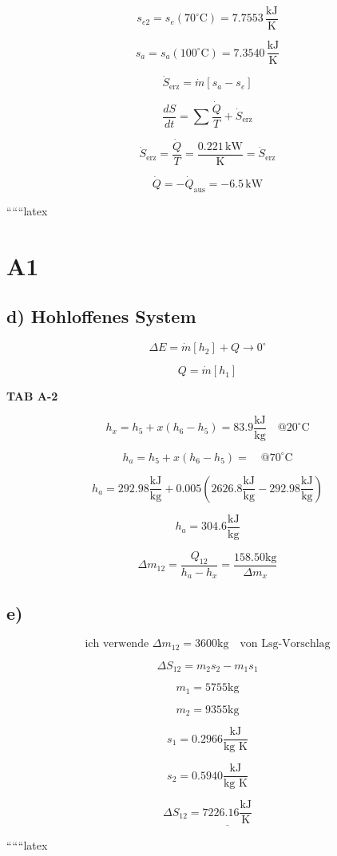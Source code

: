 \[
s_{e2} = s_e (70^\circ \text{C}) = 7.7553 \, \frac{\text{kJ}}{\text{K}}
\]

\[
s_{a} = s_a (100^\circ \text{C}) = 7.3540 \, \frac{\text{kJ}}{\text{K}}
\]

\[
\dot{S}_{\text{erz}} = \dot{m} [s_a - s_e]
\]

\[
\frac{dS}{dt} = \sum \frac{\dot{Q}}{T} + \dot{S}_{\text{erz}}
\]

\[
\dot{S}_{\text{erz}} = \frac{\dot{Q}}{T} = \frac{0.221 \, \text{kW}}{\text{K}} = \dot{S}_{\text{erz}}
\]

\[
\dot{Q} = -\dot{Q}_{\text{aus}} = -6.5 \, \text{kW}
\]

``````latex


\section*{A1}

\subsection*{d) Hohloffenes System}

\[
\Delta E = \dot{m} [h_2] + Q \rightarrow 0^\circ
\]

\[
Q = \dot{m} [h_1]
\]

\textbf{TAB A-2}

\[
h_{x} = h_{5} + x (h_{6} - h_{5}) = 83.9 \frac{\text{kJ}}{\text{kg}} \quad @ 20^\circ \text{C}
\]

\[
h_{a} = h_{5} + x (h_{6} - h_{5}) = \quad @ 70^\circ \text{C}
\]

\[
h_{a} = 292.98 \frac{\text{kJ}}{\text{kg}} + 0.005 \left( 2626.8 \frac{\text{kJ}}{\text{kg}} - 292.98 \frac{\text{kJ}}{\text{kg}} \right)
\]

\[
h_{a} = 304.6 \frac{\text{kJ}}{\text{kg}}
\]

\[
\Delta m_{12} = \frac{Q_{12}}{h_{a} - h_{x}} = \frac{158.50 \text{kg}}{\Delta m_{x}}
\]

\subsection*{e)}

\[
\text{ich verwende } \Delta m_{12} = 3600 \text{kg} \quad \text{von Lsg-Vorschlag}
\]

\[
\Delta S_{12} = m_2 s_2 - m_1 s_1
\]

\[
m_1 = 5755 \text{kg}
\]

\[
m_2 = 9355 \text{kg}
\]

\[
s_1 = 0.2966 \frac{\text{kJ}}{\text{kg K}}
\]

\[
s_2 = 0.5940 \frac{\text{kJ}}{\text{kg K}}
\]

\[
\Delta S_{12} = \underline{7226.16 \frac{\text{kJ}}{\text{K}}}
\]

``````latex


